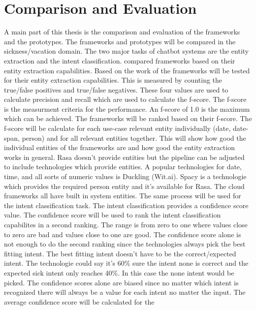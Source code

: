 \section{Comparison and Evaluation}
A main part of this thesis is the comparison and evaluation of the 
frameworks and the prototypes.
The frameworks and prototypes will be compared in the sickness/vacation domain.
The two major tasks of chatbot systems are the entity extraction and the intent 
classification.
\citet{geyer2016named} compared frameworks based on their entity extraction
capabilities.
Based on the work of \citet{geyer2016named} the frameworks will be tested 
for their entity extraction capabilities.
This is measured by counting the true/false positives and true/false negatives.
These four values are used to calculate precision and recall which 
are used to calculate the f-score.
The f-score is the measurment criteria for the performance.
An f-score of 1.0 is the maximum which can be achieved.
The frameworks will be ranked based on their f-score.
The f-score will be calculate for each use-case relevant entity 
individually (date, date-span, person) and for all relevant entities
together.
This will show how good the individual entities of the frameworks are 
and how good the entity extraction works in general.
Rasa doesn't provide entities but the pipeline can be 
adjusted to include technologies which provide entities.
A popular technologies for date, time, and all sorts of 
numeric values is Duckling (Wit.ai).
Spacy is a technologie which provides the required person entity and 
it's available for Rasa.
The cloud frameworks all have built in system entities. 
The same process will be used for the intent classification task.
The intent classification provides a confidence score value.
The confidence score will be used to rank the intent classification 
capabilites in a second ranking.
The range is from zero to one where values close to zero are 
bad and values close to one are good.
The confidence score alone is not enough to do the second ranking 
since the technologies always pick the best fitting intent.
The best fitting intent doesn't have to be the correct/expected intent.
The technologie could say it's 60\% sure the intent none is correct 
and the expected sick intent only reaches 40\%.
In this case the none intent would be picked.
The confidence scores alone are biased since no matter 
which intent is recognized there will always be a value for 
each intent no matter the input.
The average confidence score will be calculated for the 
